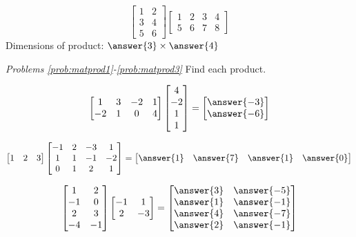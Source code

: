 \documentclass{ximera}
\begin{document}
\begin{problem}\label{prob:matproddim2}
$$\begin{bmatrix}1&2\\3&4\\5&6\end{bmatrix}\begin{bmatrix}1&2&3&4\\5&6&7&8\end{bmatrix}$$
Dimensions of product: $\answer{3}\times \answer{4}$
\end{problem}


\emph{Problems \ref{prob:matprod1}-\ref{prob:matprod3}}
Find each product.

\begin{problem}\label{prob:matprod1}
$$\begin{bmatrix}1&3&-2&1\\-2&1&0&4\end{bmatrix}\begin{bmatrix}4\\-2\\1\\1\end{bmatrix}=\begin{bmatrix}\answer{-3}\\\answer{-6}\end{bmatrix}$$
\end{problem}

\begin{problem}\label{prob:matprod2}
$$\begin{bmatrix}1&2&3\end{bmatrix}\begin{bmatrix}-1&2&-3&1\\1&1&-1&-2\\0&1&2&1\end{bmatrix}=\begin{bmatrix}\answer{1}&\answer{7}&\answer{1}&\answer{0}\end{bmatrix}$$
\end{problem}

\begin{problem}\label{prob:matprod3}
$$\begin{bmatrix}1&2\\-1&0\\2&3\\-4&-1\end{bmatrix}\begin{bmatrix}-1&1\\2&-3\end{bmatrix}=\begin{bmatrix}\answer{3}&\answer{-5}\\\answer{1}&\answer{-1}\\\answer{4}&\answer{-7}\\\answer{2}&\answer{-1}\end{bmatrix}
$$
\end{problem}
\end{document}
